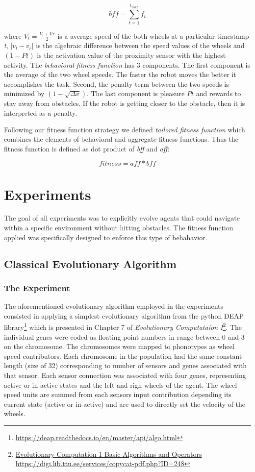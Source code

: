 \documentclass[format=acmsmall, review=false, screen=true]{acmart}
\begin{document}
\[ bff = \sum_{t=1}^{t_{max}} f_{t} \]


where \(V_{t} = \frac{V_{l} + V_{}r}{2} \) is a average speed of the both wheels at a particular timestamp \emph{t}, \(|v_{l} - v_{r}|\) is the algebraic difference between the speed values of the wheels and \((1 - P{t})\) is the activation value of the proximity sensor with the highest activity. The \emph{behavioral fitness function} has 3 components. The first component is the average of the two wheel speeds. The faster the robot moves the better it accomplishes the task. Second, the penalty term between the two speeds is minimized by \((1-\sqrt{\Delta v})\). The last component is pleasure \(P{t}\) and rewards to stay away from obstacles. If the robot is getting closer to the obstacle, then it is interpreted as a penalty.

Following our fitness function strategy we defined \emph{tailored fitness function} which combines the elements of behavioral and aggregate fitness functions. Thus the fitness function is defined as dot product of \emph{bff} and \emph{aff}:

\[ fitness = aff * bff \]

\section{Experiments}

The goal of all experiments was to explicitly evolve agents that could navigate within a specific environment without hitting obstacles. The fitness function applied was specifically designed to enforce this type of behahavior.

\subsection{Classical Evolutionary Algorithm}

\subsubsection{The Experiment}

The aforementioned evolutionary algorithm employed in the experiments consisted in applying a simplest evolutionary algorithm from the python DEAP library\footnote{\url{https://deap.readthedocs.io/en/master/api/algo.html}} which is presented in Chapter 7 of \emph{Evolutionary Computataion I}\footnote{\url{Evolutionary Computation 1 Basic Algorithms and Operators
https://digi.lib.ttu.ee/services/copycat-pdf.php?ID=248}}. The individual genes were coded as floating point numbers in range between 0 and 3 on the chromosome. The chromosomes were mapped to phonotypes as wheel speed contributors. Each chromosome in the population had the same constant length (size of 32) corresponding to number of sensors and genes associated with that sensor. Each sensor connection was associated with four genes, representing active or in-active states and the left and righ wheels of the agent. The wheel speed units are summed from each sensors input contribution depending its current state (active or in-active) and are used to directly set the velocity of the wheels.
\end{document}
